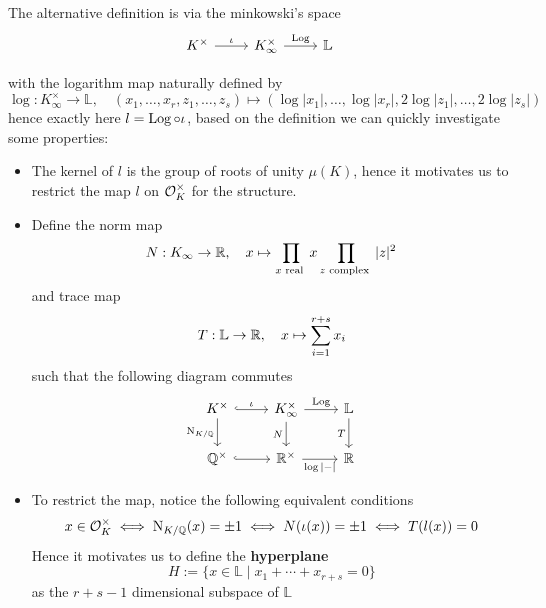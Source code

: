     \begin{remark}
        The alternative definition is via the minkowski's space
\[\begin{tikzcd}
	K^\times & {K^\times_{\infty}} & {\mathbb{L}}
	\arrow["\iota", from=1-1, to=1-2]
	\arrow["\Log", from=1-2, to=1-3]
\end{tikzcd}\]

with the logarithm map naturally defined by
\[\log: K^\times_{\infty} \to \mathbb{L}, \quad (x_1,\dots,x_r,z_1,\dots,z_s) \mapsto (\log|x_1|,\dots,\log|x_r|,2\log|z_1|,\dots,2\log|z_s|)\]
hence exactly here \(l = \operatorname{Log} \circ \iota\), based on the definition we can quickly investigate some properties:
\begin{itemize}
    \item The kernel of \(l\) is the group of roots of unity  \(\mu(K)\), hence it motivates us to restrict the map \(l\) on \(\mathcal{O}_K^\times\) for the structure.
    \item Define the norm map
    \[N: K_{\infty} \to \mathbb{R}, \quad x \mapsto \prod_{x \text{ real }}x \prod_{z \text{ complex }} |z|^2 \]
    and trace map
    \[T: \mathbb{L} \to \mathbb{R}, \quad x \mapsto \sum_{i=1}^{r+s} x_i\]
    such that the following diagram commutes
\[\begin{tikzcd}
	{K^\times} & {K_{\infty}^\times} & {\mathbb{L}} \\
	{\mathbb{Q}^\times} & {\mathbb{R}^\times} & {\mathbb{R}}
	\arrow["\iota", hook, from=1-1, to=1-2]
	\arrow["{\mathrm{N}_{K/\mathbb{Q}}}"', from=1-1, to=2-1]
	\arrow["\Log", from=1-2, to=1-3]
	\arrow["N"', from=1-2, to=2-2]
	\arrow["T"', from=1-3, to=2-3]
	\arrow[hook, from=2-1, to=2-2]
	\arrow["{\log|-|}"', from=2-2, to=2-3]
\end{tikzcd}\]

    \item To restrict the map, notice the following equivalent conditions
    \[x \in \mathcal{O}_K^\times \iff \mathrm{N}_{K/\mathbb{Q}}(x) = \pm 1 \iff N(\iota(x)) = \pm 1 \iff T(l(x)) = 0\]
    Hence it motivates us to define the \textbf{hyperplane}
    \[H := \{x \in \mathbb{L} \mid x_1 + \cdots + x_{r+s} = 0\} \]
    as the \(r+s-1\) dimensional subspace of \(\mathbb{L}\) 
    
\end{itemize}

    \end{remark}
    \newpage
